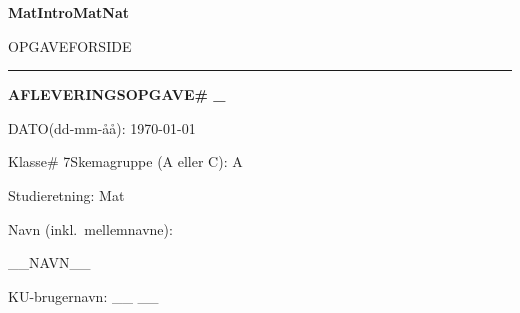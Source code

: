 	\parindent=0pt

	\begin{center}{\bf \Huge MatIntroMatNat
	\bigskip

	OPGAVEFORSIDE}
	\end{center}
	\hrule
	\vfil
	{\bf\Large
	 AFLEVERINGSOPGAVE\# _
	\vfil 

	DATO(dd-mm-åå): \today
	\vfil

	Klasse\# 7\quad Skemagruppe (A eller
	C): A 
	\vfil

	Studieretning: Mat
	\vfil

	Navn (inkl.\ mellemnavne): 

	\bigskip
	__NAVN__
	\bigskip
	\medskip

	KU-brugernavn: __ __
	\vfil}

	\newpage

